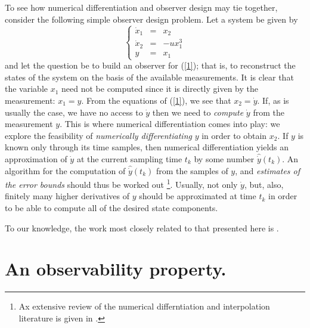 To see how numerical differentiation and observer design may tie together, 
consider the 
following simple observer design problem.
Let a system be given by
\begin{equation}
\left\{
\begin{array}{rcl}
\dot x_1 & = & x_2\\
\dot x_2 & = & -ux_1^3\\
y & = & x_1\end{array}
\right. \label{1}
\end{equation}
and let the question be to build an observer for (\ref{1}); that is,
to reconstruct the states of the system on the basis of the available
measurements.
It is clear that the variable $x_1$ need not be computed since it 
is directly given by the measurement: $ x_1 = y$.
From the equations of (\ref{1}), we see that $x_2 = \dot y$.
If, as is usually the case, we have no access to 
$\dot y$ then we need to {\it compute} $\dot y$ from the measurement $y$.
This is where numerical differentiation comes into play:
we explore the feasibility of {\it numerically
differentiating} $y$ in order to obtain $x_2$.
If $y$ is known only through its time samples, then numerical 
differentiation yields an approximation of
$\dot y$ at the current sampling time $t_k$ by some number
$\hat {\dot y}(t_k)$.
An algorithm for the computation of $\hat {\dot y}(t_k)$ from the
samples of $y$, and {\it estimates of the error bounds} should thus be worked
out \footnote{Ax extensive review of the numerical differntiation and
interpolation
literature is given in \cite{UMTechReport93}.}.
Usually, not only $\dot y$, but, also, finitely many higher
derivatives of $y$ should be approximated at time $t_k$ in order to be
able to compute all of the desired state components.

To our knowledge, the work most closely related to that presented here
is \cite{Sch73}.

\section{An observability property.}\setcounter{equation}{0}
\label{observability}

